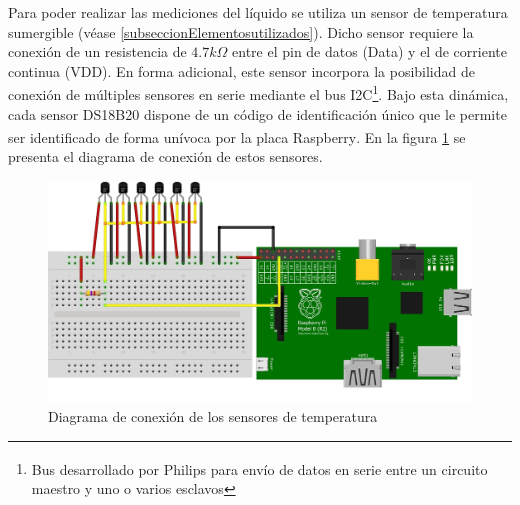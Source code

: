         \par Para poder realizar las mediciones del líquido se utiliza un sensor de temperatura sumergible (véase \ref{subseccionElementosutilizados}). Dicho sensor requiere la conexión de un resistencia de $4.7k\Omega$ entre el pin de datos (Data) y el de corriente continua (VDD). En forma adicional, este sensor incorpora la posibilidad de conexión de múltiples sensores en serie mediante el bus I2C\footnote{Bus desarrollado por Philips\textsuperscript{\textregistered} para envío de datos en serie entre un circuito maestro y uno o varios esclavos}. Bajo esta dinámica, cada sensor DS18B20 dispone de un código de identificación único que le permite ser identificado de forma unívoca por la placa Raspberry\textsuperscript{\textregistered}. En la figura \ref{fig:ConexionTemperatura} se presenta el diagrama de conexión de estos sensores.
        \begin{figure}[h]
            \centering
            \includegraphics[scale = 0.8]{DiagramaSensordeTemp_bb.jpg}
            \caption{Diagrama de conexión de los sensores de temperatura}
            \label{fig:ConexionTemperatura}
        \end{figure}
        
